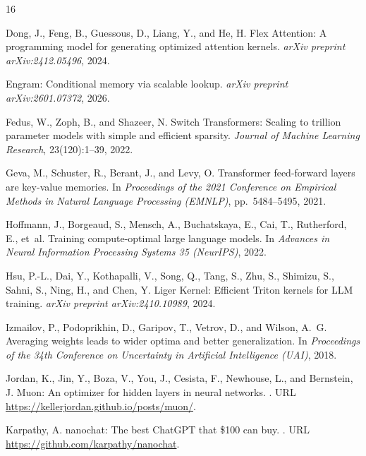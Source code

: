 \documentclass{article}
\begin{document}
\begin{thebibliography}{16}

Dong, J., Feng, B., Guessous, D., Liang, Y., and He, H.
\newblock Flex Attention: A programming model for generating optimized attention kernels.
\newblock \emph{arXiv preprint arXiv:2412.05496}, 2024.

Engram: Conditional memory via scalable lookup.
\newblock \emph{arXiv preprint arXiv:2601.07372}, 2026.

Fedus, W., Zoph, B., and Shazeer, N.
\newblock Switch Transformers: Scaling to trillion parameter models with simple and efficient sparsity.
\newblock \emph{Journal of Machine Learning Research}, 23(120):1--39, 2022.

Geva, M., Schuster, R., Berant, J., and Levy, O.
\newblock Transformer feed-forward layers are key-value memories.
\newblock In \emph{Proceedings of the 2021 Conference on Empirical Methods in Natural Language Processing (EMNLP)}, pp.\ 5484--5495, 2021.

Hoffmann, J., Borgeaud, S., Mensch, A., Buchatskaya, E., Cai, T., Rutherford, E., et~al.
\newblock Training compute-optimal large language models.
\newblock In \emph{Advances in Neural Information Processing Systems 35 (NeurIPS)}, 2022.

Hsu, P.-L., Dai, Y., Kothapalli, V., Song, Q., Tang, S., Zhu, S., Shimizu, S., Sahni, S., Ning, H., and Chen, Y.
\newblock Liger Kernel: Efficient Triton kernels for LLM training.
\newblock \emph{arXiv preprint arXiv:2410.10989}, 2024.

Izmailov, P., Podoprikhin, D., Garipov, T., Vetrov, D., and Wilson, A.~G.
\newblock Averaging weights leads to wider optima and better generalization.
\newblock In \emph{Proceedings of the 34th Conference on Uncertainty in Artificial Intelligence (UAI)}, 2018.

Jordan, K., Jin, Y., Boza, V., You, J., Cesista, F., Newhouse, L., and Bernstein, J.
\newblock Muon: An optimizer for hidden layers in neural networks.
.
\newblock URL \url{https://kellerjordan.github.io/posts/muon/}.

Karpathy, A.
\newblock nanochat: The best ChatGPT that \$100 can buy.
.
\newblock URL \url{https://github.com/karpathy/nanochat}.


\end{thebibliography}
\end{document}
